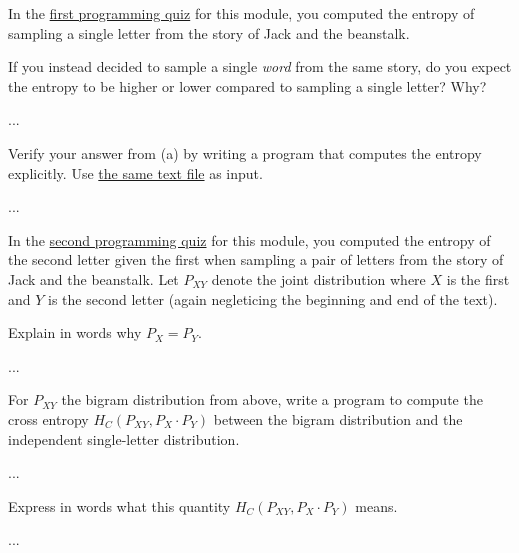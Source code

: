 \documentclass[a4paper,10pt]{article}
\begin{document}
\begin{subproblem}{1}
In the \href{https://canvas.uva.nl/courses/10933/assignments/72716}{first programming quiz} for this module, you computed the entropy of sampling a single letter from the story of Jack and the beanstalk.

If you instead decided to sample a single \emph{word} from the same story, do you expect the entropy to be higher or lower compared to sampling a single letter? Why?
\end{subproblem}

\begin{solution}
...
\end{solution}

\begin{subproblem}{3}
Verify your answer from (a) by writing a program that computes the entropy explicitly. Use \href{https://raw.githubusercontent.com/cschaffner/InformationTheory/master/2019/Text/Jack.txt}{the same text file} as input.
\end{subproblem}

\begin{solution}
...
\end{solution}

\begin{subproblem}{1}
In the \href{https://canvas.uva.nl/courses/10933/assignments/72715}{second programming quiz} for this module, you computed the entropy of the second letter given the first when sampling a pair of letters from the story of Jack and the beanstalk. Let $P_{XY}$ denote the joint distribution where $X$ is the first and $Y$ is the second letter (again negleticing the beginning and end of the text).

Explain in words why $P_X = P_Y$.
\end{subproblem}

\begin{solution}
...
\end{solution}

\begin{subproblem}{2}
For $P_{XY}$ the bigram distribution from above, write a program to compute the cross entropy $H_C(P_{XY} , P_X \cdot P_Y)$ between the bigram distribution and the independent single-letter distribution.
\end{subproblem}

\begin{solution}
...
\end{solution}

\begin{subproblem}{1}
Express in words what this quantity  $H_C(P_{XY} , P_X \cdot P_Y)$ means.
\end{subproblem}

\begin{solution}
...
\end{solution}
\end{document}
